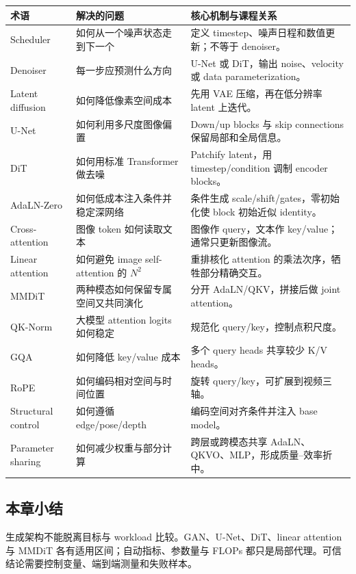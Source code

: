\begin{center}
\small
\begin{tabularx}{\textwidth}{p{} X X}
\toprule
\textbf{术语} & \textbf{解决的问题} & \textbf{核心机制与课程关系} \\
\midrule
Scheduler & 如何从一个噪声状态走到下一个 & 定义 timestep、噪声日程和数值更新；不等于 denoiser。 \\
Denoiser & 每一步应预测什么方向 & U-Net 或 DiT，输出 noise、velocity 或 data parameterization。 \\
Latent diffusion & 如何降低像素空间成本 & 先用 VAE 压缩，再在低分辨率 latent 上迭代。 \\
U-Net & 如何利用多尺度图像偏置 & Down/up blocks 与 skip connections 保留局部和全局信息。 \\
DiT & 如何用标准 Transformer 做去噪 & Patchify latent，用 timestep/condition 调制 encoder blocks。 \\
AdaLN-Zero & 如何低成本注入条件并稳定深网络 & 条件生成 scale/shift/gates，零初始化使 block 初始近似 identity。 \\
Cross-attention & 图像 token 如何读取文本 & 图像作 query，文本作 key/value；通常只更新图像流。 \\
Linear attention & 如何避免 image self-attention 的 $N^2$ & 重排核化 attention 的乘法次序，牺牲部分精确交互。 \\
MMDiT & 两种模态如何保留专属空间又共同演化 & 分开 AdaLN/QKV，拼接后做 joint attention。 \\
QK-Norm & 大模型 attention logits 如何稳定 & 规范化 query/key，控制点积尺度。 \\
GQA & 如何降低 key/value 成本 & 多个 query heads 共享较少 K/V heads。 \\
RoPE & 如何编码相对空间与时间位置 & 旋转 query/key，可扩展到视频三轴。 \\
Structural control & 如何遵循 edge/pose/depth & 编码空间对齐条件并注入 base model。 \\
Parameter sharing & 如何减少权重与部分计算 & 跨层或跨模态共享 AdaLN、QKVO、MLP，形成质量--效率折中。 \\
\bottomrule
\end{tabularx}
\end{center}

\subsection{本章小结}

生成架构不能脱离目标与 workload 比较。GAN、U-Net、DiT、linear attention 与 MMDiT 各有适用区间；自动指标、参数量与 FLOPs 都只是局部代理。可信结论需要控制变量、端到端测量和失败样本。

